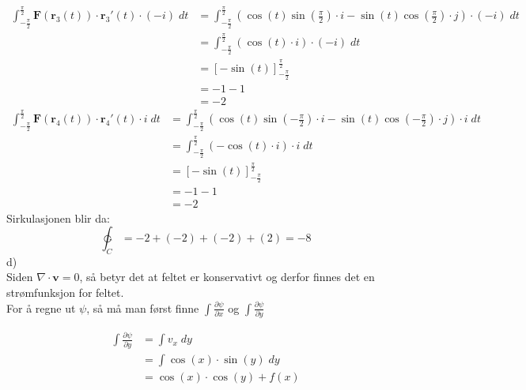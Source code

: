 \documentclass[12pt, a4paper]{article}
\begin{document}
\begin{equation}
    \begin{split}
        \int_{-\frac{\pi}{2}}^{\frac{\pi}{2}} \textbf{F}(\textbf{r}_3(t)) \cdot \textbf{r}_3'(t) \cdot (-i) \; dt &= \int_{-\frac{\pi}{2}}^{\frac{\pi}{2}} (\cos(t)\sin\left(\frac{\pi}{2}\right) \cdot i - \sin(t)\cos\left(\frac{\pi}{2}\right) \cdot j) \cdot (-i) \; dt \\
        &= \int_{-\frac{\pi}{2}}^{\frac{\pi}{2}} (\cos(t) \cdot i) \cdot (-i) \; dt \\
        &= \left[- \sin(t) \right]_{-\frac{\pi}{2}}^{\frac{\pi}{2}} \\
        &= - 1 - 1 \\
        &= -2
    \end{split}
\end{equation}
\begin{equation}
    \begin{split}
        \int_{-\frac{\pi}{2}}^{\frac{\pi}{2}} \textbf{F}(\textbf{r}_4(t)) \cdot \textbf{r}_4'(t) \cdot i \; dt &= \int_{-\frac{\pi}{2}}^{\frac{\pi}{2}} (\cos(t)\sin\left(-\frac{\pi}{2}\right) \cdot i - \sin(t)\cos\left(-\frac{\pi}{2}\right) \cdot j) \cdot i \; dt \\
        &= \int_{-\frac{\pi}{2}}^{\frac{\pi}{2}} (- \cos(t) \cdot i) \cdot i \; dt \\
        &= \left[- \sin(t) \right]_{-\frac{\pi}{2}}^{\frac{\pi}{2}} \\
        &= - 1 - 1 \\
        &= -2
    \end{split}
\end{equation}
Sirkulasjonen blir da:
\begin{equation}
    \ointctrclockwise_C = -2 + (-2) + (-2) + (2) = -8
\end{equation}
\newpage
d) \\
Siden $\nabla \cdot \textbf{v} = 0$, så betyr det at feltet er konservativt og derfor finnes det en strømfunksjon for feltet. \\
For å regne ut $\psi$, så må man først finne $\int \frac{\partial \psi}{\partial x}$ og $\int \frac{\partial \psi}{\partial y}$

\begin{equation}
    \begin{split}
        \int \frac{\partial \psi}{\partial y} &= \int v_x \; dy \\
                                              &= \int \cos(x) \cdot \sin(y) \; dy \\
                                              &= \cos(x) \cdot \cos(y) + f(x)
    \end{split}
\end{equation}
\end{document}
